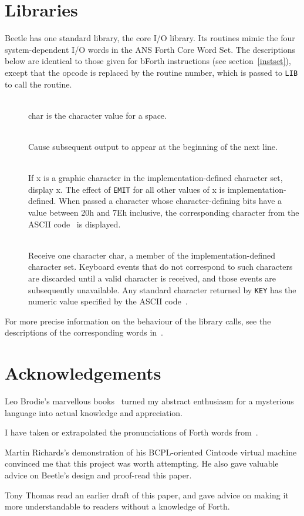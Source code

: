 \documentclass{article}
\newcommand{\spic}[1]{{\spfont\setlength{\baselineskip}{\normalbaselineskip}#1\/}}
\newlength{\itemwidth}\itemwidth=\textwidth \advance\itemwidth by -0.1in
\newlength{\instname}\instname=0.5in
\newlength{\pronunc}\pronunc=1.7in
\newlength{\opcode}\opcode=0.5in
\newlength{\stackcom}\stackcom=3.0in
\newcommand{\inst}[4]{\item[]\parbox{\itemwidth}%
{\makebox[\instname][l]{\tt #1}\makebox[\pronunc][r]{}\makebox[\opcode][r]%
{#2}\makebox[\stackcom][r]{\tt ( \spic{#3} )}\\[0.5ex]#4}}
\newcommand{\instp}[5]{\item[]\parbox{\itemwidth}%
{\makebox[\instname][l]{\tt #1}\makebox[\pronunc][r]{``#2''}%
\makebox[\opcode][r]{#3}\makebox[\stackcom][r]{\tt ( \spic{#4} )}\\[0.5ex]%
#5}}
\begin{document}
\section{Libraries}
\label{libraries}

Beetle has one standard library, the core I/O library. Its routines mimic the
four system-dependent I/O words in the ANS Forth Core Word Set. The descriptions
below are identical to those given for bForth instructions (see section~\ref{instset}),
except that the opcode is replaced by the routine number, which
is passed to {\tt LIB} to call the routine.

\begin{description}
\instp{BL}{b-l}{0}{-- char}{\spic{char} is the character value for a space.}
\instp{CR}{c-r}{1}{--}{Cause subsequent output to appear at the beginning of the next line.}
\inst{EMIT}{2}{x --}{If \spic{x} is a graphic character in the implementation-defined character set, display \spic{x}. The effect of {\tt EMIT} for all other values of \spic{x} is implementation-defined. When passed a character whose character-defining bits have a value between 20h and 7Eh inclusive, the corresponding character from the ASCII code~\cite{ASCII} is displayed.}
\inst{KEY}{3}{-- char}{Receive one character \spic{char}, a member of the implementation-defined character set. Keyboard events that do not correspond to such characters are discarded until a valid character is received, and those events are subsequently unavailable. Any standard character returned by {\tt KEY} has the numeric value specified by the ASCII code~\cite{ASCII}.}
\end{description}

For more precise information on the behaviour of the library calls, see the
descriptions of the corresponding words in~\cite[chapter 6]{ANSIforth}.


\section*{Acknowledgements}

Leo Brodie's marvellous books~\cite{starting4th,thinking4th} turned my abstract
enthusiasm for a mysterious language into actual knowledge and appreciation.

I have taken or extrapolated the pronunciations of Forth words from~\cite{ANSIforth}.

Martin Richards's demonstration of his BCPL-oriented Cintcode virtual machine
convinced me that this project was worth attempting. He also gave valuable
advice on Beetle's design and proof-read this paper.

Tony Thomas read an earlier draft of this paper, and gave advice on making it
more understandable to readers without a knowledge of Forth.




\end{document}
